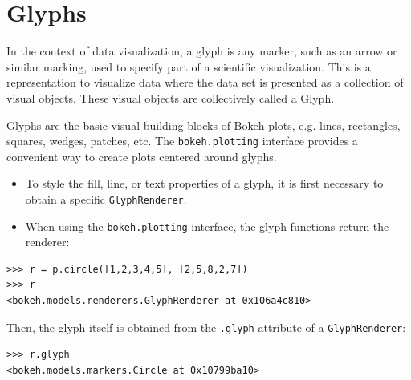 \documentclass[a4paper,12pt]{article}
\begin{document}
	\large

\section*{Glyphs}
\begin{framed}
\noindent In the context of data visualization, a glyph is any marker, such as an arrow or similar marking, used to specify part of a scientific visualization. This is a representation to visualize data where the data set is presented as a collection of visual objects. These visual objects are collectively called a Glyph.
\end{framed}
Glyphs are the basic visual building blocks of Bokeh plots, e.g. lines, rectangles, squares, wedges, patches, etc. The \texttt{bokeh.plotting} interface provides a convenient way to create plots centered around glyphs.

\bigskip
\begin{itemize}
\item To style the fill, line, or text properties of a glyph, it is first necessary to obtain a specific \texttt{GlyphRenderer}. 

\item 
When using the \texttt{bokeh.plotting} interface, the glyph functions return the renderer:
\end{itemize}


\begin{framed}
\begin{verbatim}
>>> r = p.circle([1,2,3,4,5], [2,5,8,2,7])
>>> r
<bokeh.models.renderers.GlyphRenderer at 0x106a4c810>
\end{verbatim}
\end{framed}



Then, the glyph itself is obtained from the \texttt{.glyph} attribute of a \texttt{GlyphRenderer}:

\begin{framed}
	\begin{verbatim}
>>> r.glyph
<bokeh.models.markers.Circle at 0x10799ba10>
\end{verbatim}
\end{framed}
\newpage
\end{document}
